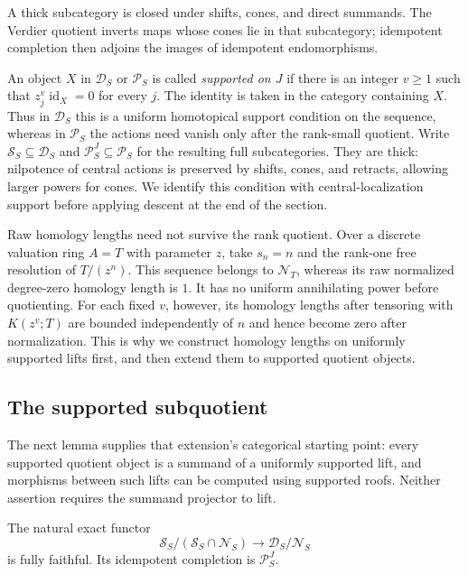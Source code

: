 A thick subcategory is closed under shifts, cones, and direct summands.
The Verdier quotient inverts maps whose cones lie in that subcategory;
idempotent completion then adjoins the images of idempotent endomorphisms.

An object $X$ in $\mathcal D_S$ or $\mathcal P_S$ is called
\emph{supported on $J$} if there is an integer $v\geq1$ such that
$z_j^v\operatorname{id}_X=0$ for every $j$. The identity is taken
in the category containing $X$. Thus in $\mathcal D_S$ this is a
uniform homotopical support condition on the sequence, whereas in
$\mathcal P_S$ the actions need vanish only after the rank-small
quotient. Write $\mathcal S_S\subseteq\mathcal D_S$ and
$\mathcal P_S^J\subseteq\mathcal P_S$ for the resulting full
subcategories. They are thick: nilpotence of central actions is
preserved by shifts, cones, and retracts, allowing larger powers
for cones. We identify this condition with central-localization
support before applying descent at the end of the section.

\begin{remark}
\label{as:nonuniform-warning}
Raw homology lengths need not survive the rank quotient. Over a
discrete valuation ring $A=T$ with parameter $z$, take $s_n=n$ and
the rank-one free resolution of $T/(z^n)$. This sequence belongs to
$\mathcal N_T$, whereas its raw normalized degree-zero homology
length is $1$. It has no uniform annihilating power before
quotienting. For each fixed $v$, however, its homology lengths after
tensoring with $K(z^v;T)$ are bounded independently of $n$ and hence
become zero after normalization. This is why we construct homology
lengths on uniformly supported lifts first, and then extend them to
supported quotient objects.
\end{remark}

\subsection{The supported subquotient}

The next lemma supplies that extension's categorical starting point:
every supported quotient object is a summand of a uniformly supported
lift, and morphisms between such lifts can be computed using supported
roofs. Neither assertion requires the summand projector to lift.

\begin{lemma}
\label{as:supported-quotient}
The natural exact functor
\[
 \mathcal S_S/(\mathcal S_S\cap\mathcal N_S)
 \longrightarrow \mathcal D_S/\mathcal N_S
\]
is fully faithful. Its idempotent completion is
$\mathcal P_S^J$.
\end{lemma}

